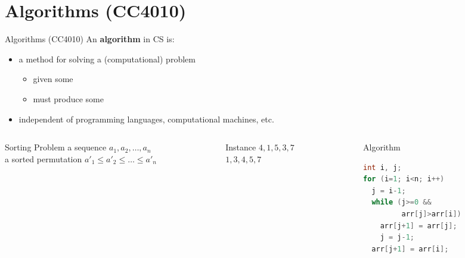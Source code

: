 \documentclass[aspectratio=169]{beamer}
\begin{document}
\frame[plain]{\titlepage}




\section{Algorithms (CC4010)}

\begin{frame}[fragile]{Algorithms (CC4010)}
An \alert{\textbf{algorithm}} in CS is:

\begin{itemize}
  \item a \alert{method} for solving a (computational) problem
  \begin{itemize}
    \item given some 
    \item must produce some 
  \end{itemize}
  \item \alert{independent} of programming languages, computational machines, etc.
\end{itemize}

\begin{columns}[T]
\begin{column}{0.31\textwidth}
  \begin{alertblock}{Sorting Problem}
   a sequence $a_1, a_2, \ldots , a_n$
  \\
   a sorted permutation $a'_1 \leq a'_2 \leq \ldots \leq a'_n$
  \end{alertblock}
\end{column}\begin{column}{0.31\textwidth}
  \begin{exampleblock}{Instance}
   $4,1,5,3,7$
  \\
   $1,3,4,5,7$
  \end{exampleblock}
\end{column}\begin{column}{0.31\textwidth}
  \begin{block}{Algorithm}
  ~\\[-5pt]
  \begin{lstlisting}[language=C++,emph={[1]arr}]
int i, j;
for (i=1; i<n; i++)
  j = i-1;
  while (j>=0 &&
         arr[j]>arr[i])
    arr[j+1] = arr[j];
    j = j-1; 
  arr[j+1] = arr[i];
  \end{lstlisting}~\\[-20pt]
  \end{block}
\end{column}
\end{columns}

\end{frame}
\end{document}
